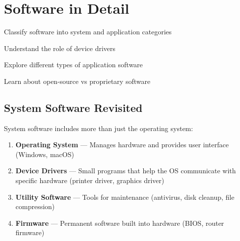 
\chapter{Software in Detail}
\label{ch:software-detail}

\begin{objectives}
  \item Classify software into system and application categories
  \item Understand the role of device drivers
  \item Explore different types of application software
  \item Learn about open-source vs proprietary software
\end{objectives}


\section{System Software Revisited}
\label{sec:system-sw-detail}

System software includes more than just the operating system:

\begin{theorybox}
\begin{enumerate}[label=\textcolor{ModuleBlue}{\textbf{\arabic*.}}, itemsep=4pt]
  \item \textbf{Operating System} --- Manages hardware and provides user interface (Windows, macOS)
  \item \textbf{Device Drivers} --- Small programs that help the OS communicate with specific hardware (printer driver, graphics driver)
  \item \textbf{Utility Software} --- Tools for maintenance (antivirus, disk cleanup, file compression)
  \item \textbf{Firmware} --- Permanent software built into hardware (BIOS, router firmware)
\end{enumerate}
\end{theorybox}

